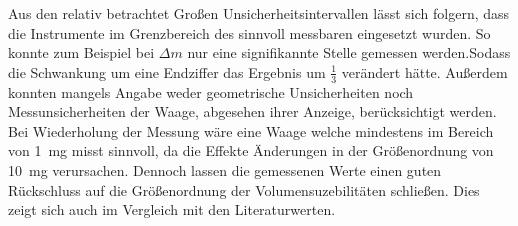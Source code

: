 Aus den relativ betrachtet Großen Unsicherheitsintervallen lässt sich folgern, dass die Instrumente im Grenzbereich des sinnvoll messbaren eingesetzt wurden. So konnte zum Beispiel bei $\Delta m$ nur eine signifikannte Stelle gemessen werden.Sodass die Schwankung um eine Endziffer das Ergebnis um $\frac{1}{3}$ verändert hätte.  Außerdem konnten mangels Angabe weder geometrische Unsicherheiten noch Messunsicherheiten der Waage, abgesehen ihrer Anzeige, berücksichtigt werden. Bei Wiederholung der Messung wäre eine Waage welche mindestens im Bereich von \SI{1}{mg} misst sinnvoll, da die Effekte Änderungen in der Größenordnung von \SI{10}{mg} verursachen.
Dennoch lassen die gemessenen Werte einen guten Rückschluss auf die Größenordnung der Volumensuzebilitäten schließen. Dies zeigt sich auch im Vergleich mit den Literaturwerten.\\

